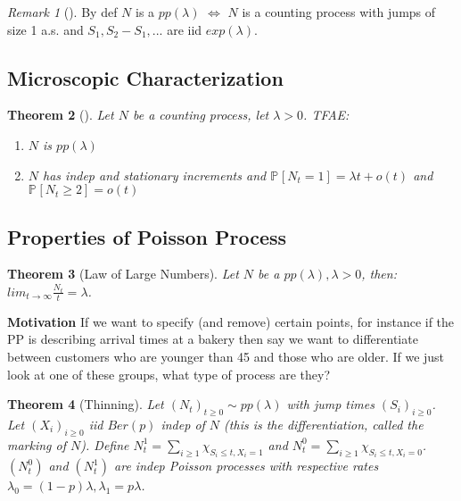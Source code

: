 \documentclass[12pt]{book}
\renewcommand{\iff}{\Leftrightarrow}
\newtheorem{theorem}{Theorem}[section]
\theoremstyle{definition}
\theoremstyle{remark}
\newtheorem{rmk}[theorem]{Remark}
\begin{document}
\begin{rmk}[]
	By def $N$ is a $pp(\lambda)$ $\iff $ $N$ is a counting process with jumps of size 1 a.s. and  $S_1,S_2-S_1,...$ are iid  $exp(\lambda)$.
\end{rmk}

\subsection{Microscopic Characterization}
\begin{theorem}[]
	Let $N$ be a counting process, let $\lambda> 0$. TFAE:
\begin{enumerate}
	\item $N$ is $pp(\lambda)$ 
	\item $N$ has indep and stationary increments and $\mathbb{P}_{} \left[ N_t =1 \right] = \lambda t + o(t)$ and $\mathbb{P}_{} \left[ N_t \geq 2 \right] = o(t)$
\end{enumerate}

\end{theorem}

\subsection{Properties of Poisson Process}

\begin{theorem}[Law of Large Numbers]
Let $N$ be a $pp(\lambda), \lambda > 0$, then: $lim_{t \to \infty} \frac{N_t}{t}=\lambda$.
\end{theorem}

\textbf{Motivation} If we want to specify (and remove) certain points, for instance if the PP is describing arrival times at a bakery then say we want to differentiate between customers who are younger than 45 and those who are older. If we just look at one of these groups, what type of process are they?

\begin{theorem}[Thinning]
	Let $(N_t)_{t\geq 0} \sim pp(\lambda)$ with jump times $(S_i)_{i\geq 0}$. Let $(X_i)_{i\geq 0}$ iid $Ber(p)$ indep of $N$ (this is the differentiation, called the marking of $N$). Define $N_t^1 = \sum_{i\geq 1}^{} \chi_{S_i \leq t, X_i = 1}$ and $N_t^0 = \sum_{i \geq 1}^{} \chi_{S_i \leq t, X_i = 0}$.
\\ \noindent	
	$(N_t^0)$ and  $(N_t^1)$ are indep Poisson processes with respective rates  $\lambda_0 = (1-p)\lambda, \lambda _1=p\lambda $.
\end{theorem}
\end{document}
